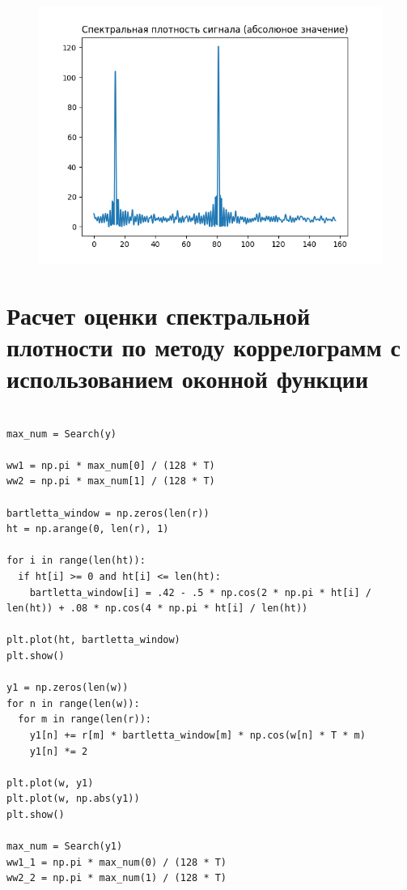 \documentclass[12pt]{article}
\begin{document}
\begin{figure}[!htb]
\centering
\includegraphics[scale=1.00]{sig_spectral_density_abs.png}
\caption{}
\label{}
\end{figure}



\section{Расчет оценки спектральной плотности по методу коррелограмм с использованием оконной функции}

\begin{lstlisting}

max_num = Search(y)

ww1 = np.pi * max_num[0] / (128 * T)
ww2 = np.pi * max_num[1] / (128 * T)

bartletta_window = np.zeros(len(r))
ht = np.arange(0, len(r), 1)

for i in range(len(ht)):
  if ht[i] >= 0 and ht[i] <= len(ht):
    bartletta_window[i] = .42 - .5 * np.cos(2 * np.pi * ht[i] / len(ht)) + .08 * np.cos(4 * np.pi * ht[i] / len(ht))

plt.plot(ht, bartletta_window)
plt.show()

y1 = np.zeros(len(w))
for n in range(len(w)):
  for m in range(len(r)):
    y1[n] += r[m] * bartletta_window[m] * np.cos(w[n] * T * m)
    y1[n] *= 2

plt.plot(w, y1)
plt.plot(w, np.abs(y1))
plt.show()

max_num = Search(y1)
ww1_1 = np.pi * max_num(0) / (128 * T)
ww2_2 = np.pi * max_num(1) / (128 * T)
\end{lstlisting}
\end{document}
